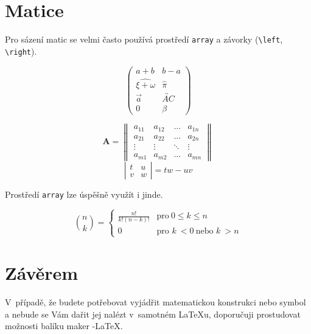 \documentclass[a4paper,11pt,twocolumn]{article}
\theoremstyle{definition}
\theoremstyle{definition}
\theoremstyle{definition}
\begin{document}
\section{Matice}

Pro sázení matic se velmi často používá prostředí \texttt{array} a závorky (\verb|\left|, \verb|\right|). 

$$ \left( \begin{array}{cc}
  a + b & b - a \\
  \widehat{\xi + \omega} & \hat{\pi} \\
  \vec{a} & \overleftrightarrow{AC} \\
  0 & \beta
 \end{array} \right) $$

$$\mathbf{A} = 
 \left\|
 \begin{array}{cccc}
  a_{11} & a_{12} & \ldots & a_{1n} \\
  a_{21} & a_{22} & \ldots & a_{2n} \\
  \vdots & \vdots  & \ddots & \vdots \\
  a_{m1} & a_{m2} & \ldots & a_{mn}
 \end{array} \right\| $$
$$ \left| \begin{array}{cc}
  t & u \\
  v & w
 \end{array} \right|
= tw - uv $$

Prostředí \texttt{array} lze úspěšně využít i jinde.

$$\binom{n}{k} = \left\{ \begin{array}{ll}
\frac{n!}{k!(n-k)!} & \mbox{pro}\ 0 \leq k \leq n\\
0 & \mbox{pro } k\ < 0\ \mbox{nebo } k\ > n\end{array} \right.$$ 

\section{Závěrem}

V~případě, že budete potřebovat vyjádřit matematickou konstrukci nebo symbol a nebude se Vám dařit jej nalézt v~samotném \LaTeX u, doporučuji prostudovat možnosti balíku maker \AmS-\LaTeX.
\end{document}
